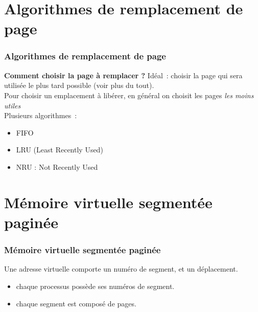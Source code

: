 \section{Algorithmes de remplacement de page}
\begin{frame}
  \frametitle{Algorithmes de remplacement de page}
  \textbf{Comment choisir la page à remplacer ?}
  Idéal~: choisir la page qui sera utilisée le plus tard possible (voir
  plus du tout).\\
  
  Pour choisir un emplacement à libérer, en général on choisit les pages
  \emph{les moins utiles}\\
  \vspace{0.5cm}
  Plusieurs algorithmes~:
  \begin{itemize}
  \item FIFO
  \item LRU (Least Recently Used) 
  \item NRU : Not Recently Used
  \end{itemize}
\end{frame}

\section{Mémoire virtuelle segmentée paginée}
\begin{frame}
  \frametitle{Mémoire virtuelle segmentée paginée}
  
  Une adresse virtuelle comporte un numéro de segment, et un déplacement.
  
  \begin{itemize}
  \item chaque processus possède ses numéros de segment. 
  \item chaque segment est composé de pages. 
  \end{itemize}
\end{frame}

